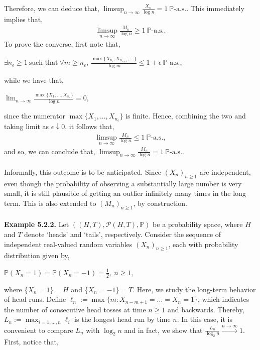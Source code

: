 \documentclass{article}
\begin{document}
Therefore, we can deduce that, $\limsup_{n\to\infty}\frac{X_n}{\log{n}} = 1 \ \mathbb{P}\text{-a.s.}$. This immediately implies that,
\begin{eqnarray}
\nonumber
\limsup_{n\to\infty}\frac{M_n}{\log{n}} \geq 1 \ \mathbb{P}\text{-a.s.}.
\end{eqnarray}
To prove the converse, first note that,
\begin{center}
	$\exists n_\epsilon \geq 1 \ \text{such that} \ \forall m \geq n_\epsilon, \ \frac{\max\{X_{n_\epsilon}, X_{n_{\epsilon+1}}, ...\}}{\log{m}} \leq 1+\epsilon \ \mathbb{P}\text{-a.s.}$,
\end{center}
while we have that,
\begin{center}
	$\lim_{n\to\infty}\frac{\max\{X_1,...,X_{n_\epsilon}\}}{\log{n}} = 0$,
\end{center}
since the numerator $\max\{X_1,...,X_{n_\epsilon}\}$ is finite. Hence, combining the two and taking limit as $\epsilon \downarrow 0$, it follows that,
\begin{eqnarray}
\nonumber
\limsup_{n\to\infty}\frac{M_n}{\log{n}} \leq 1 \ \mathbb{P}\text{-a.s.},
\end{eqnarray}
and so, we can conclude that, $\limsup_{n\to\infty}\frac{M_n}{\log{n}} = 1 \ \mathbb{P}\text{-a.s.}$.\\\\
Informally, this outcome is to be anticipated. Since $(X_n)_{n\geq1}$ are independent, even though the probability of observing a substantially large number is very small, it is still plausible of getting an outlier infinitely many times in the long term. This is also extended to $(M_n)_{n\geq1}$, by construction.\\\\
\textbf{Example 5.2.2.} Let $((H,T),\mathcal{P}(H,T),\mathbb{P})$ be a probability space, where $H$ and $T$ denote ‘heads’ and ‘tails’, respectively. Consider the sequence of independent real-valued random variables $(X_n)_{n\geq1}$, each with probability distribution given by,
\begin{center}
	$\mathbb{P}(X_n = 1) = \mathbb{P}(X_n = -1) = \frac{1}{2}, \ n\geq1$,
\end{center}
where $\{X_n = 1\} = H$ and $\{X_n = -1\} = T$. Here, we study the long-term behavior of head runs. Define $\ell_n := \max\{m: X_{n-m+1} = ... = X_n = 1\}$, which indicates the number of consecutive head tosses at time $n\geq1$ and backwards. Thereby, $L_n := \max_{i=1,...,n}\ell_i$ is the longest head run by time $n$. In this case, it is convenient to compare $L_n$ with $\log_2{n}$ and in fact, we show that $\frac{L_n}{\log_2{n}} \xrightarrow{n\to\infty} 1$. First, notice that,
\end{document}
